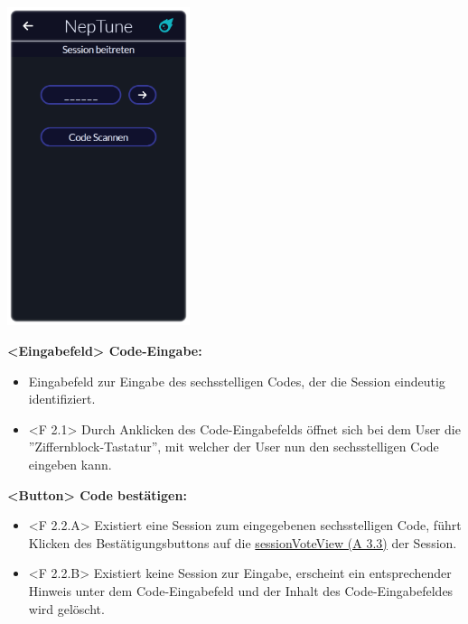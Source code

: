 \documentclass[oneside, ngerman]{sdqtechreport}
\begin{document}
\begin{center}
    \hypertarget{joinSessionView}{}
    \includegraphics[width=0.4\textwidth]{LATEX/Pflichtenheft/GraphicDesigns/userJoinGroupPage.png}
\end{center}

\textbf{<Eingabefeld> Code-Eingabe:}
\begin{itemize}
    \item Eingabefeld zur Eingabe des sechsstelligen Codes, der die Session eindeutig identifiziert.
    \hypertarget{<F 2.1>}{}
    \item <F 2.1> Durch Anklicken des Code-Eingabefelds öffnet sich bei dem User die ''Ziffernblock-Tastatur'', mit welcher der User nun den sechsstelligen Code eingeben kann.
\end{itemize}

\textbf{<Button> Code bestätigen:}
\begin{itemize}
    \hypertarget{<F 2.2.A>}{}
    \item <F 2.2.A> Existiert eine Session zum eingegebenen sechsstelligen Code, führt Klicken des Bestätigungsbuttons auf die \hyperlink{sessionVoteView}{sessionVoteView (A 3.3)} der Session.
    \hypertarget{<F 2.2.B>}{}
    \item <F 2.2.B> Existiert keine Session zur Eingabe, erscheint ein entsprechender Hinweis unter dem Code-Eingabefeld und der Inhalt des Code-Eingabefeldes wird gelöscht.
\end{itemize}
\end{document}
